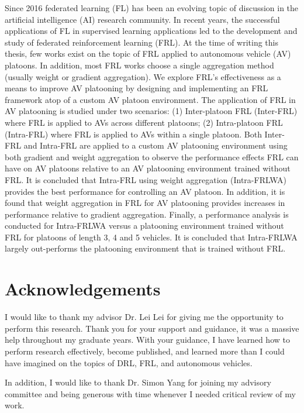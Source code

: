 \documentclass[oneside, 12pt]{book}
\begin{document}
Since 2016 federated learning (FL) has been an evolving topic of discussion in the artificial
intelligence (AI) research community.  In recent years, the successful applications of FL
in supervised learning applications led to the development and study of
federated reinforcement learning (FRL).  At the time of writing this thesis,
few works exist on the topic of FRL applied to
autonomous vehicle (AV) platoons. In addition, most FRL works choose a single aggregation
method (usually weight or gradient aggregation). We explore FRL's effectiveness as a means
to improve AV platooning by designing and implementing an FRL framework atop of a custom
AV platoon environment.  The application of FRL in AV platooning is studied under two
scenarios: (1)  Inter-platoon FRL (Inter-FRL) where FRL is applied to AVs across different
platoons; (2) Intra-platoon FRL (Intra-FRL) where FRL is applied to AVs within a single
platoon. Both Inter-FRL and Intra-FRL are applied to a custom AV platooning environment using
both gradient and weight aggregation to observe the performance effects FRL can have on AV
platoons relative to an AV platooning environment trained without FRL.  It is concluded that
Intra-FRL using weight aggregation (Intra-FRLWA) provides the best performance for
controlling an AV platoon. In addition, it is found that weight aggregation in FRL for
AV platooning provides increases in performance relative to gradient aggregation.
Finally, a performance analysis is conducted for Intra-FRLWA versus a platooning
environment trained without FRL for platoons of length 3, 4 and 5 vehicles. It is concluded
that Intra-FRLWA largely out-performs the platooning environment that is trained without FRL.

\chapter*{Acknowledgements}
I would like to thank my advisor Dr. Lei Lei for giving me the opportunity to perform this research.
Thank you for your support and guidance, it was a massive help throughout my graduate years.  With your guidance,
I have learned how to perform research effectively, become published, and learned more than I could have imagined on
the topics of DRL, FRL, and autonomous vehicles.

In addition, I would like to thank Dr. Simon Yang for joining my advisory committee and being
generous with time whenever I needed critical review of my work.

\tableofcontents
\listoftables
\listoffigures
\newpage
\end{document}
